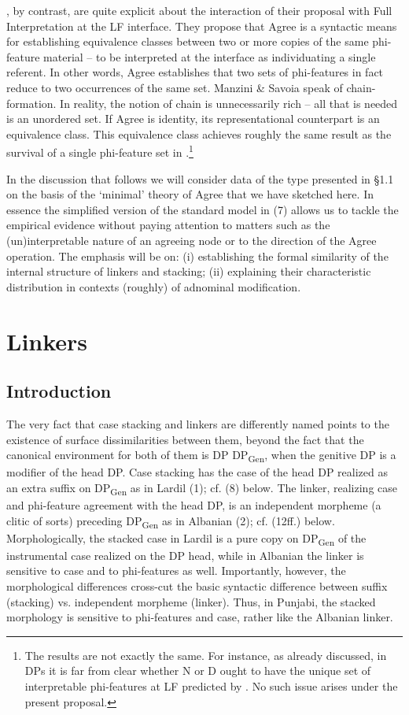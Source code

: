 \documentclass[output=paper]{langsci/langscibook}
\begin{document}
   \citet{Manzini2007}, by contrast, are quite explicit about the interaction of their proposal with Full Interpretation at the LF interface. They propose that Agree is a syntactic means for establishing equivalence classes between two or more copies of the same phi-feature material – to be interpreted at the interface as individuating a single referent. In other words, Agree establishes that two sets of phi-features in fact reduce to two occurrences of the same set. Manzini \& Savoia speak of chain-formation. In reality, the notion of chain is unnecessarily rich – all that is needed is an unordered set. If Agree is identity, its representational counterpart is an equivalence class. This equivalence class achieves roughly the same result as the survival of a single phi-feature set in \citet{Chomsky2000,Chomsky2001}.\footnote{The results are not exactly the same. For instance, {as already discussed, in DPs it is far from clear whether N or D ought to have the unique set of interpretable phi-featu}{r}{es at LF}{ predicted by \citet{Chomsky2001}. No such issue arises under the present proposal.}}

  In the discussion that follows we will consider data of the type presented in §1.1 on the basis of the ‘minimal’ theory of Agree that we have sketched here. In essence the simplified version of the standard model in (7) allows us to tackle the empirical evidence without paying attention to matters such as the (un)interpretable nature of an agreeing node or to the direction of the Agree operation. The emphasis will be on: (i) establishing the formal similarity of the internal structure of linkers and stacking; (ii) explaining their characteristic distribution in contexts (roughly) of adnominal modification.   

\section{Linkers} %

\subsection{Introduction}%

The very fact that case stacking and linkers are differently named points to the existence of surface dissimilarities between them, beyond the fact that the canonical environment for both of them is DP DP\textsubscript{Gen}, when the genitive DP is a modifier of the head DP. Case stacking has the case of the head DP realized as an extra suffix on DP\textsubscript{Gen} as in Lardil (1); cf. (8) below. The linker, realizing case and phi-feature agreement with the head DP, is an independent morpheme (a clitic of sorts) preceding DP\textsubscript{Gen} as in Albanian (2); cf. (12ff.) below. Morphologically, the stacked case in Lardil is a pure copy on DP\textsubscript{Gen} of the instrumental case realized on the DP head, while in Albanian the linker is sensitive to case and to phi-features as well. Importantly, however, the morphological differences cross-cut the basic syntactic difference between suffix (stacking) vs. independent morpheme (linker). Thus, in Punjabi, the stacked morphology is sensitive to phi-features and case, rather like the Albanian linker.  
\end{document}
